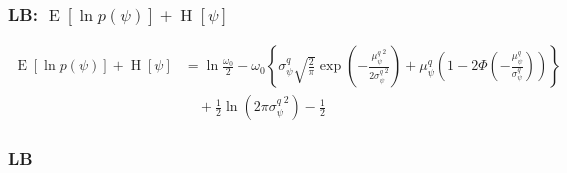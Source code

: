 \documentclass[11pt]{article}
\newcommand{\opn}{\operatorname}
\begin{document}
\subsubsection{LB: $\opn{E}\left[\ln p\left(\psi\right)\right] +\opn{H}\left[\psi\right]$}
\begin{align*}
  \opn{E}\left[\ln p\left(\psi\right)\right] +\opn{H}\left[\psi\right] &= \ln\frac{\omega_{0}}{2} -\omega_{0}\left\{\sigma_{\psi}^{q}\sqrt{\frac{2}{\pi}} \exp\left(-\frac{{\mu_{\psi}^{q}}^{2}}{2{\sigma_{\psi}^{q}}^{2}}\right) + \mu_{\psi}^{q}\left(1-2\Phi\left(-\frac{\mu_{\psi}^{q}}{\sigma_{\psi}^{q}}\right)\right) \right\}\\
  &\quad +\frac{1}{2}\ln\left(2\pi {\sigma_{\psi}^{q}}^{2}\right) -\frac{1}{2}
\end{align*}
\subsubsection{LB}
\end{document}
